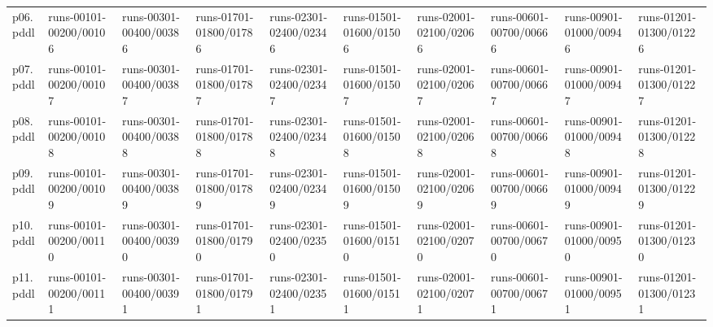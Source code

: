 \documentclass{article}
\begin{document}
\begin{tabular}{@{}lrrrrrrrrr@{}}
p06.pddl & \multicolumn{1}{|l|}{runs-00101-00200/00106} & \multicolumn{1}{|l|}{runs-00301-00400/00386} & \multicolumn{1}{|l|}{runs-01701-01800/01786} & \multicolumn{1}{|l|}{runs-02301-02400/02346} & \multicolumn{1}{|l|}{runs-01501-01600/01506} & \multicolumn{1}{|l|}{runs-02001-02100/02066} & \multicolumn{1}{|l|}{runs-00601-00700/00666} & \multicolumn{1}{|l|}{runs-00901-01000/00946} & \multicolumn{1}{|l|}{runs-01201-01300/01226} \\
p07.pddl & \multicolumn{1}{|l|}{runs-00101-00200/00107} & \multicolumn{1}{|l|}{runs-00301-00400/00387} & \multicolumn{1}{|l|}{runs-01701-01800/01787} & \multicolumn{1}{|l|}{runs-02301-02400/02347} & \multicolumn{1}{|l|}{runs-01501-01600/01507} & \multicolumn{1}{|l|}{runs-02001-02100/02067} & \multicolumn{1}{|l|}{runs-00601-00700/00667} & \multicolumn{1}{|l|}{runs-00901-01000/00947} & \multicolumn{1}{|l|}{runs-01201-01300/01227} \\
p08.pddl & \multicolumn{1}{|l|}{runs-00101-00200/00108} & \multicolumn{1}{|l|}{runs-00301-00400/00388} & \multicolumn{1}{|l|}{runs-01701-01800/01788} & \multicolumn{1}{|l|}{runs-02301-02400/02348} & \multicolumn{1}{|l|}{runs-01501-01600/01508} & \multicolumn{1}{|l|}{runs-02001-02100/02068} & \multicolumn{1}{|l|}{runs-00601-00700/00668} & \multicolumn{1}{|l|}{runs-00901-01000/00948} & \multicolumn{1}{|l|}{runs-01201-01300/01228} \\
p09.pddl & \multicolumn{1}{|l|}{runs-00101-00200/00109} & \multicolumn{1}{|l|}{runs-00301-00400/00389} & \multicolumn{1}{|l|}{runs-01701-01800/01789} & \multicolumn{1}{|l|}{runs-02301-02400/02349} & \multicolumn{1}{|l|}{runs-01501-01600/01509} & \multicolumn{1}{|l|}{runs-02001-02100/02069} & \multicolumn{1}{|l|}{runs-00601-00700/00669} & \multicolumn{1}{|l|}{runs-00901-01000/00949} & \multicolumn{1}{|l|}{runs-01201-01300/01229} \\
p10.pddl & \multicolumn{1}{|l|}{runs-00101-00200/00110} & \multicolumn{1}{|l|}{runs-00301-00400/00390} & \multicolumn{1}{|l|}{runs-01701-01800/01790} & \multicolumn{1}{|l|}{runs-02301-02400/02350} & \multicolumn{1}{|l|}{runs-01501-01600/01510} & \multicolumn{1}{|l|}{runs-02001-02100/02070} & \multicolumn{1}{|l|}{runs-00601-00700/00670} & \multicolumn{1}{|l|}{runs-00901-01000/00950} & \multicolumn{1}{|l|}{runs-01201-01300/01230} \\
p11.pddl & \multicolumn{1}{|l|}{runs-00101-00200/00111} & \multicolumn{1}{|l|}{runs-00301-00400/00391} & \multicolumn{1}{|l|}{runs-01701-01800/01791} & \multicolumn{1}{|l|}{runs-02301-02400/02351} & \multicolumn{1}{|l|}{runs-01501-01600/01511} & \multicolumn{1}{|l|}{runs-02001-02100/02071} & \multicolumn{1}{|l|}{runs-00601-00700/00671} & \multicolumn{1}{|l|}{runs-00901-01000/00951} & \multicolumn{1}{|l|}{runs-01201-01300/01231} \\

\end{tabular}
\end{document}
